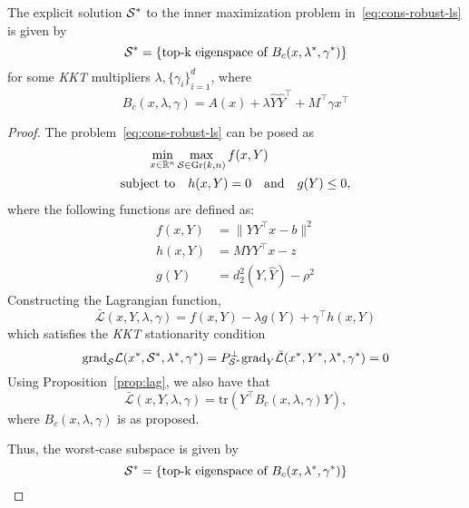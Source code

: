 \begin{proposition}
    The explicit solution $\mathcal{S}^*$ to the inner maximization problem in~\eqref{eq:cons-robust-ls} is given by
    \[
        \mathcal{S}^* = \{ \textrm{top-k eigenspace of } B_c(x, \lambda^*, \gamma^*)\}
    \]
    for some \emph{KKT} multipliers $\lambda, {\{\gamma_i\}}_{i=1}^d$, where
    \[
        B_c(x,\lambda,\gamma) = A(x) + \lambda \hat{Y}\hat{Y}^\top + M^\top \gamma x^\top
    \]
    \begin{proof}
        The problem~\eqref{eq:cons-robust-ls} can be posed as
        \begin{equation}
        \begin{split}
            \min_{x \in \mathbb{R}^n} & \max_{\mathcal{S} \in \text{Gr}(k,n)} f(x,Y) \\
            \textrm{subject to} & \quad h(x,Y) = 0 \quad \textrm{and} \quad g(Y) \leq 0,
        \end{split}
        \end{equation}
        where the following functions are defined as:
        \begin{equation*}
            \begin{split}
                f(x,Y) &= \lVert YY^\top x - b \rVert^2 \\
                h(x,Y) &= MYY^\top x - z \\
                g(Y) &= d_2^2(Y,\hat{Y}) - \rho^2
            \end{split}
        \end{equation*}
        Constructing the Lagrangian function,
        \[
            \mathcal{\bar{L}}(x,Y,\lambda, \gamma) = f(x,Y) - \lambda g(Y) + \gamma^\top h(x,Y)
        \]
        which satisfies the \emph{KKT} stationarity condition 
        \[
            \textrm{grad}_{\mathcal{S}} \mathcal{L}(x^*,\mathcal{S}^*, \lambda^*, \gamma^*) = P^{\perp}_{\mathcal{S}^*} \mathrm{grad }_{Y} \mathcal{\bar{L}}(x^*, Y^*, \lambda^*, \gamma^*) = 0 
        \]
        Using Proposition~\ref{prop:lag}, we also have that
        \[
            \mathcal{\bar{L}}(x,Y, \lambda, \gamma) = \mathrm{tr}\left(Y^\top B_c(x,\lambda, \gamma) Y \right),
        \]
        where $B_c(x,\lambda,\gamma)$ is as proposed.

        Thus, the worst-case subspace is given by 
        \[
            \mathcal{S}^* = \{ \textrm{top-k eigenspace of } B_c(x, \lambda^*, \gamma^*)\}
        \]

    \end{proof}
\end{proposition}

